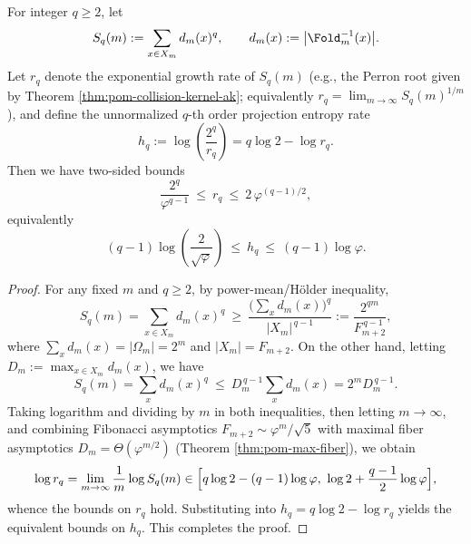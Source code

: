 \begin{proposition}\label{prop:pom-rq-universal-bounds}
For integer \(q\ge 2\), let
$$
S_q(m):=\sum_{x\in X_m} d_m(x)^q,\qquad d_m(x):=\bigl|\Fold_m^{-1}(x)\bigr|.
$$
Let \(r_q\) denote the exponential growth rate of \(S_q(m)\) (e.g., the Perron root given by Theorem \ref{thm:pom-collision-kernel-ak}; equivalently \(r_q=\lim_{m\to\infty}S_q(m)^{1/m}\)), and define the unnormalized \(q\)-th order projection entropy rate
$$
h_q:=\log\!\left(\frac{2^q}{r_q}\right)=q\log 2-\log r_q.
$$
Then we have two-sided bounds
$$
\frac{2^q}{\varphi^{q-1}}\ \le\ r_q\ \le\ 2\,\varphi^{(q-1)/2},
$$
equivalently
$$
(q-1)\log\!\left(\frac{2}{\sqrt{\varphi}}\right)\ \le\ h_q\ \le\ (q-1)\log\varphi.
$$
\end{proposition}
\begin{proof}
For any fixed \(m\) and \(q\ge 2\), by power-mean/Hölder inequality,
$$
S_q(m)=\sum_{x\in X_m}d_m(x)^q\ \ge\ \frac{\bigl(\sum_x d_m(x)\bigr)^q}{|X_m|^{\,q-1}}
:=\frac{2^{qm}}{F_{m+2}^{\,q-1}},
$$
where \(\sum_x d_m(x)=|\Omega_m|=2^m\) and \(|X_m|=F_{m+2}\).
On the other hand, letting \(D_m:=\max_{x\in X_m} d_m(x)\), we have
$$
S_q(m)=\sum_x d_m(x)^q\ \le\ D_m^{\,q-1}\sum_x d_m(x)=2^m D_m^{\,q-1}.
$$
Taking logarithm and dividing by \(m\) in both inequalities, then letting \(m\to\infty\), and combining Fibonacci asymptotics \(F_{m+2}\sim \varphi^{m}/\sqrt5\) with maximal fiber asymptotics \(D_m=\Theta(\varphi^{m/2})\) (Theorem \ref{thm:pom-max-fiber}), we obtain
$$
\log r_q=\lim_{m\to\infty}\frac{1}{m}\log S_q(m)\in\Bigl[q\log 2-(q-1)\log\varphi,\ \log 2+\frac{q-1}{2}\log\varphi\Bigr],
$$
whence the bounds on \(r_q\) hold. Substituting into \(h_q=q\log 2-\log r_q\) yields the equivalent bounds on \(h_q\). This completes the proof.
\end{proof}

